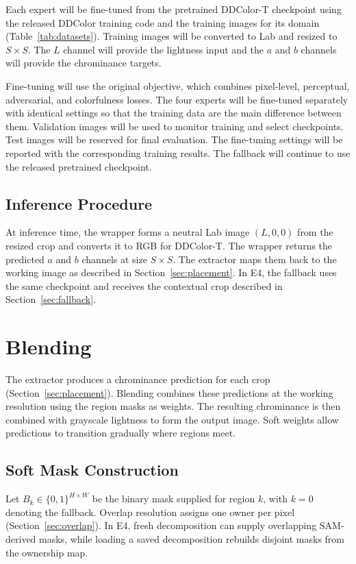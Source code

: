 \documentclass{FastFyp}
\begin{document}
Each expert will be fine-tuned from the pretrained DDColor-T checkpoint
using the released DDColor training code and the training images for its
domain (Table~\ref{tab:datasets}). Training images will be converted to
Lab and resized to $S\times S$. The $L$ channel will provide the lightness
input and the $a$ and $b$ channels will provide the chrominance targets.

Fine-tuning will use the original objective, which combines pixel-level,
perceptual, adversarial, and colorfulness losses. The four experts will be
fine-tuned separately with identical settings so that the training data
are the main difference between them. Validation images will be used to
monitor training and select checkpoints. Test images will be reserved for
final evaluation. The fine-tuning settings will be reported with the
corresponding training results. The fallback will continue to use the
released pretrained checkpoint.

\subsection{Inference Procedure}

At inference time, the wrapper forms a neutral Lab image $(L,0,0)$ from
the resized crop and converts it to RGB for DDColor-T. The wrapper returns
the predicted $a$ and $b$ channels at size $S\times S$. The extractor maps
them back to the working image as described in Section~\ref{sec:placement}.
In E4, the fallback uses the same checkpoint and receives the contextual
crop described in Section~\ref{sec:fallback}.

\section{Blending}
\label{sec:blending}

The extractor produces a chrominance prediction for each crop
(Section~\ref{sec:placement}). Blending combines these predictions at
the working resolution using the region masks as weights. The resulting
chrominance is then combined with grayscale lightness to form the output
image. Soft weights allow predictions to transition gradually where
regions meet.

\subsection{Soft Mask Construction}

Let $B_k\in\{0,1\}^{H\times W}$ be the binary mask supplied for region $k$,
with $k=0$ denoting the fallback. Overlap resolution assigns one owner per
pixel (Section~\ref{sec:overlap}). In E4, fresh decomposition can supply
overlapping SAM-derived masks, while loading a saved decomposition
rebuilds disjoint masks from the ownership map.
\end{document}
